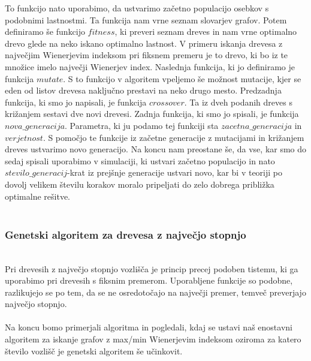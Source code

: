 \documentclass[12pt,a4paper]{amsart}
\theoremstyle{definition} %
\theoremstyle{plain} %
\begin{document}
To funkcijo nato uporabimo, da ustvarimo začetno populacijo osebkov s podobnimi lastnostmi. 
Ta funkcija nam vrne seznam slovarjev grafov. Potem definiramo še funkcijo $fitness$, 
ki preveri seznam dreves in nam vrne optimalno drevo glede na neko iskano optimalno lastnost. 
V primeru iskanja drevesa z največjim Wienerjevim indeksom pri fiksnem premeru je to drevo, 
ki bo iz te množice imelo največji Wienerjev index.
Naslednja funkcija, ki jo definiramo je funkcija $mutate$.
S to funkcijo v algoritem vpeljemo še možnost mutacije, kjer se eden od listov drevesa naključno prestavi na neko drugo mesto.
Predzadnja funkcija, ki smo jo napisali, je funkcija $crossover$. 
Ta iz dveh podanih dreves s križanjem sestavi dve novi drevesi. 
Zadnja funkcija, ki smo jo spisali, je funkcija $nova\_generacija$. 
Parametra, ki ju podamo tej funkciji sta $zacetna\_generacija$ in $verjetnost$. 
S pomočjo te funkcije iz začetne generacije z mutacijami in križanjem dreves ustvarimo novo generacijo.
Na koncu nam preostane še, da vse, kar smo do sedaj spisali uporabimo v simulaciji,
ki ustvari začetno populacijo in nato $stevilo\_generacij$-krat iz prejšnje generacije ustvari novo,
kar bi v teoriji po dovolj velikem številu korakov moralo pripeljati do zelo dobrega približka optimalne rešitve.
\\
\\
\subsubsection{Genetski algoritem za drevesa z največjo stopnjo}
\
\\
Pri drevesih z največjo stopnjo vozlišča je princip precej podoben tistemu, ki ga uporabimo pri drevesih s fiksnim premerom.
Uporabljene funkcije so podobne, razlikujejo se po tem, da se ne osredotočajo na največji premer, temveč preverjajo največjo stopnjo.
\\
\\
Na koncu bomo primerjali algoritma in pogledali, kdaj se ustavi naš enostavni algoritem za iskanje grafov z max/min Wienerjevim indeksom
oziroma za katero število vozlišč je genetski algoritem še učinkovit.
\end{document}

